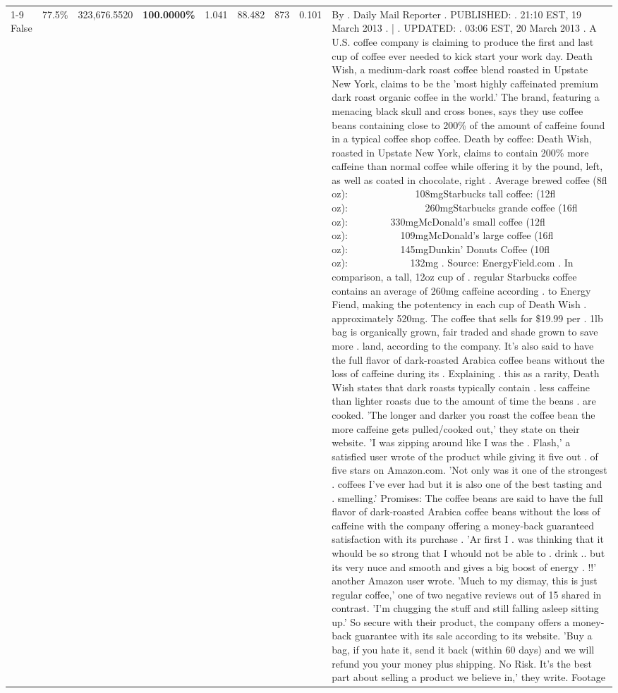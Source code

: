 \begin{table}[H]
{\begin{tabular}{lllrlllll}
\cline{1-9} \cline{2-9}
False & 77.5\% & 323,676.5520 & \bfseries \color{red} 100.0000\% & 1.041 & 88.482 & 873 & 0.101 & By . Daily Mail Reporter . PUBLISHED: . 21:10 EST, 19 March 2013 . | . UPDATED: . 03:06 EST, 20 March 2013 . A U.S. coffee company is claiming to produce the first and last cup of coffee ever needed to kick start your work day. Death Wish, a medium-dark roast coffee blend roasted in Upstate New York, claims to be the 'most highly caffeinated premium dark roast organic coffee in the world.' The brand, featuring a menacing black skull and cross bones, says they use coffee beans containing close to 200\% of the amount of caffeine found in a typical coffee shop coffee. Death by coffee: Death Wish, roasted in Upstate New York, claims to contain 200\% more caffeine than normal coffee while offering it by the pound, left, as well as coated in chocolate, right . Average brewed coffee (8fl oz):              108mgStarbucks tall coffee: (12fl oz):                260mgStarbucks grande coffee (16fl oz):         330mgMcDonald's small coffee (12fl oz):           109mgMcDonald's large coffee (16fl oz):           145mgDunkin' Donuts Coffee (10fl oz):             132mg . Source: EnergyField.com . In comparison, a tall, 12oz cup of . regular Starbucks coffee contains an average of 260mg caffeine according . to Energy Fiend, making the potentency in each cup of Death Wish . approximately 520mg. The coffee that sells for \$19.99 per . 1lb bag is organically grown, fair traded and shade grown to save more . land, according to the company. It's also said to have the full flavor of dark-roasted Arabica coffee beans without the loss of caffeine during its . Explaining . this as a rarity, Death Wish states that dark roasts typically contain . less caffeine than lighter roasts due to the amount of time the beans . are cooked. 'The longer and darker you roast the coffee bean the more caffeine gets pulled/cooked out,' they state on their website. 'I was zipping around like I was the . Flash,' a satisfied user wrote of the product while giving it five out . of five stars on Amazon.com. 'Not only was it one of the strongest . coffees I've ever had but it is also one of the best tasting and . smelling.’ Promises: The coffee beans are said to have the full flavor of dark-roasted Arabica coffee beans without the loss of caffeine with the company offering a money-back guaranteed satisfaction with its purchase . 'Ar first I . was thinking that it whould be so strong that I whould not be able to . drink .. but its very nuce and smooth and gives a big boost of energy . !!' another Amazon user wrote. 'Much to my dismay, this is just regular coffee,' one of two negative reviews out of 15 shared in contrast. 'I'm chugging the stuff and still falling asleep sitting up.' So secure with their product, the company offers a money-back guarantee with its sale according to its website. 'Buy a bag, if you hate it, send it back (within 60 days) and we will refund you your money plus shipping. No Risk. It’s the best part about selling a product we believe in,' they write. Footage \\

\end{tabular}}
\end{table}
